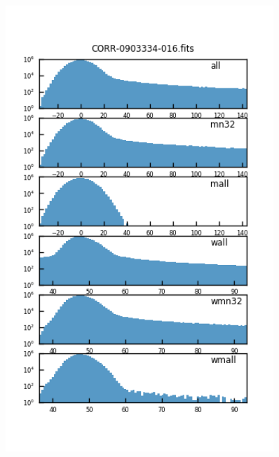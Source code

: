 \begin{figure}[t]
\centering
  \begin{minipage}{.45\textwidth}
    \centering
    \includegraphics[width=0.9\textwidth]{figure/imgdist_CORR-0903334-016.fits.png}
  \end{minipage}
  \begin{minipage}{.45\textwidth}
    \centering

\end{minipage}
\end{figure}
